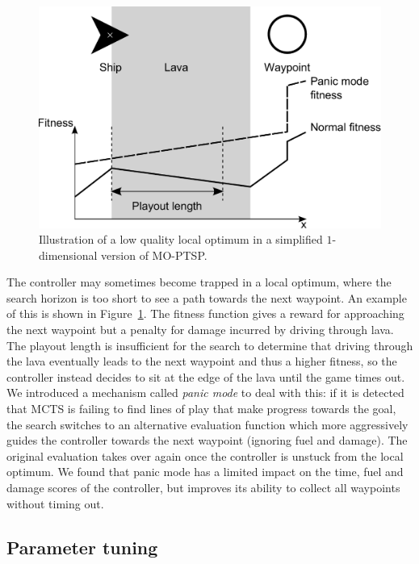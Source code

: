 \documentclass[conference]{IEEEtran}
\begin{document}
\begin{figure}%
\includegraphics[width=\columnwidth]{img/local-optimum.pdf}%
\caption{Illustration of a low quality local optimum in a simplified \mbox{$1$-dimensional} version of MO-PTSP.}%
\label{fig:local-optimum}%
\end{figure}

The controller may sometimes become trapped in a local optimum,
where the search horizon is too short to see a path towards the next waypoint.
An example of this is shown in Figure~\ref{fig:local-optimum}.
The fitness function gives a reward for approaching the next waypoint but a penalty for damage incurred by driving through lava.
The playout length is insufficient for the search to determine that driving through the lava eventually leads to the next waypoint and thus a higher fitness,
so the controller instead decides to sit at the edge of the lava until the game times out.
We introduced a mechanism called \emph{panic mode} to deal with this:
if it is detected that MCTS is failing to find lines of play that make progress towards the goal,
the search switches to an alternative evaluation function which more aggressively guides the controller towards the next waypoint (ignoring fuel and damage).
The original evaluation takes over again once the controller is unstuck from the local optimum.
We found that panic mode has a limited impact on the time, fuel and damage scores of the controller,
but improves its ability to collect all waypoints without timing out.

\subsection{Parameter tuning}
\end{document}
